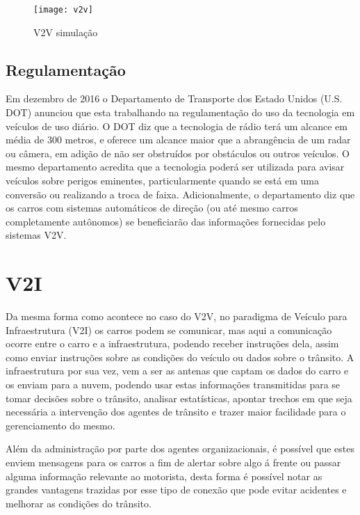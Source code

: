 \begin{figure}[!h]
\caption{\label{fig:simulacao} V2V simulação}
\begin{center}
\texttt{[image: v2v]}
\end{center}
\end{figure}

\subsection{Regulamentação}
\label{subsec:regulamentacao}
Em dezembro de 2016 o Departamento de Transporte dos Estado Unidos (U.S. DOT) anunciou que esta trabalhando na regulamentação do uso da tecnologia em veículos de uso diário. O DOT diz que a tecnologia de rádio terá um alcance em média de 300 metros, e oferece um alcance maior que a abrangência de um radar ou câmera, em adição de não ser obstruídos por obstáculos ou outros veículos. O mesmo departamento acredita que a tecnologia poderá ser utilizada para avisar veículos sobre perigos eminentes, particularmente quando se está em uma conversão ou realizando a troca de faixa. Adicionalmente, o departamento diz que os carros com sistemas automáticos de direção (ou até mesmo carros completamente autônomos) se beneficiarão das informações fornecidas pelo sistemas V2V.~\cite{usdot}

\section{V2I}
\label{sec:v2i}
Da mesma forma como acontece no caso do V2V, no paradigma de Veículo para Infraestrutura (V2I) os carros podem se comunicar, mas aqui a comunicação ocorre entre o carro e a infraestrutura, podendo receber instruções dela, assim como enviar instruções sobre as condições do veículo ou dados sobre o trânsito. A infraestrutura por sua vez, vem a ser as antenas que captam os dados do carro e os enviam para a nuvem, podendo usar estas informações transmitidas para se tomar decisões sobre o trânsito, analisar estatísticas, apontar trechos em que seja necessária a intervenção dos agentes de trânsito e trazer maior facilidade para o gerenciamento do mesmo.~\cite{howard2014}

Além da administração por parte dos agentes organizacionais, é possível que estes enviem mensagens para os carros a fim de alertar sobre algo á frente ou passar alguma informação relevante ao motorista, desta forma é possível notar as grandes vantagens trazidas por esse tipo de conexão que pode evitar acidentes e melhorar as condições do trânsito.~\cite{howard2014}


